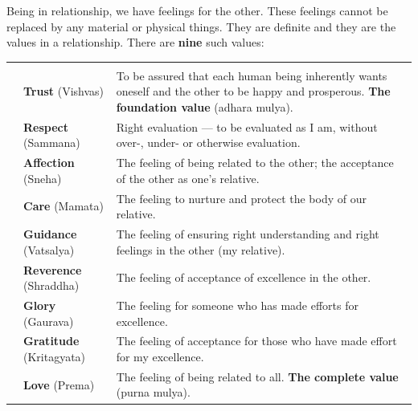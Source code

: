 
\ans Being in relationship, we have feelings for the other. These feelings
cannot be replaced by any material or physical things. They are definite and
they are the values in a relationship. There are \textbf{nine} such values:

\renewcommand{\arraystretch}{1.3}
\begin{longtable}{C{7mm} P{45mm} P{95mm}}
\hdr{\#} &  & 
  \\ \hline \endfirsthead
{}\hdr{\#} &  & 
  \\ \hline \endhead
{} & \textbf{Trust} (Vishvas) & To be assured that each human being
  inherently wants oneself and the other to be happy and prosperous.
  \textbf{The foundation value} (adhara mulya). \\ \hline
{} & \textbf{Respect} (Sammana) & Right evaluation --- to be evaluated as
  I am, without over-, under- or otherwise evaluation. \\ \hline
{} & \textbf{Affection} (Sneha) & The feeling of being related to the
  other; the acceptance of the other as one's relative. \\ \hline
{} & \textbf{Care} (Mamata) & The feeling to nurture and protect the body
  of our relative. \\ \hline
{} & \textbf{Guidance} (Vatsalya) & The feeling of ensuring right
  understanding and right feelings in the other (my relative). \\ \hline
{} & \textbf{Reverence} (Shraddha) & The feeling of acceptance of
  excellence in the other. \\ \hline
{} & \textbf{Glory} (Gaurava) & The feeling for someone who has made
  efforts for excellence. \\ \hline
{} & \textbf{Gratitude} (Kritagyata) & The feeling of acceptance for those
  who have made effort for my excellence. \\ \hline
{} & \textbf{Love} (Prema) & The feeling of being related to all.
  \textbf{The complete value} (purna mulya). \\ \hline
\end{longtable}


